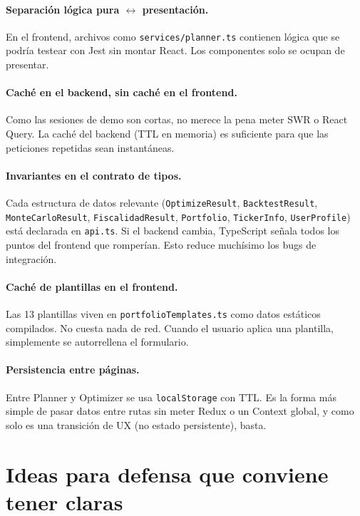 \documentclass[11pt,a4paper]{book}
\begin{document}
\paragraph{Separación lógica pura $\leftrightarrow$ presentación.} En el frontend, archivos como \texttt{services/planner.ts} contienen lógica que se podría testear con Jest sin montar React. Los componentes solo se ocupan de presentar.

\paragraph{Caché en el backend, sin caché en el frontend.} Como las sesiones de demo son cortas, no merece la pena meter SWR o React Query. La caché del backend (TTL en memoria) es suficiente para que las peticiones repetidas sean instantáneas.

\paragraph{Invariantes en el contrato de tipos.} Cada estructura de datos relevante (\texttt{OptimizeResult}, \texttt{BacktestResult}, \texttt{MonteCarloResult}, \texttt{FiscalidadResult}, \texttt{Portfolio}, \texttt{TickerInfo}, \texttt{UserProfile}) está declarada en \texttt{api.ts}. Si el backend cambia, TypeScript señala todos los puntos del frontend que romperían. Esto reduce muchísimo los bugs de integración.

\paragraph{Caché de plantillas en el frontend.} Las 13 plantillas viven en \texttt{portfolioTemplates.ts} como datos estáticos compilados. No cuesta nada de red. Cuando el usuario aplica una plantilla, simplemente se autorrellena el formulario.

\paragraph{Persistencia entre páginas.} Entre Planner y Optimizer se usa \texttt{localStorage} con TTL. Es la forma más simple de pasar datos entre rutas sin meter Redux o un Context global, y como solo es una transición de UX (no estado persistente), basta.

\section{Ideas para defensa que conviene tener claras}
\end{document}
